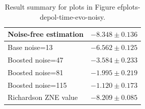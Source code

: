 \begin{table}
\caption{Result summary for plots in Figure 
ef{plots-depol-time-evo-noisy}.}
\begin{tabular*}{\textwidth}{@{\extracolsep{\fill}}ll@{}}
\toprule

Noise-free estimation & $-8.348 \pm 0.136$ \\
\midrule
Base noise=13 & $-6.562 \pm 0.125$ \\
Boosted noise=47 & $-3.584 \pm 0.233$ \\
Boosted noise=81 & $-1.995 \pm 0.219$ \\
Boosted noise=115 & $-1.120 \pm 0.173$ \\
\midrule
Richardson ZNE value & $-8.209 \pm 0.085$ \\
\bottomrule
\end{tabular*}
\label{table-depol-time-evo-noisy}
\end{table}
